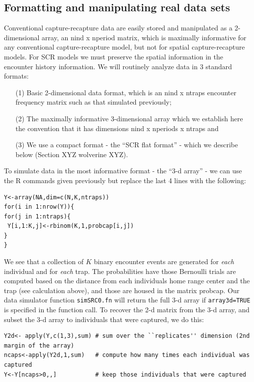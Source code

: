 \subsection{Formatting and manipulating real data sets}

Conventional capture-recapture data are easily stored and manipulated as a 2-dimensional array, an nind x nperiod matrix, which is maximally informative for any conventional capture-recapture model, but not for spatial capture-recapture models.  For SCR models we must preserve the spatial information in the encounter history information. We will routinely analyze data in 3 standard formats: 

\begin{itemize}
\item[(1)] Basic 2-dimensional data format, which is an nind x ntraps encounter frequency matrix such as that simulated previously; 
\item[(2)] The maximally informative 3-dimensional array which we establish here the convention that it has dimensions nind x nperiods x ntraps and 
\item[(3)] We use a compact format - the ``SCR flat format'' - which we describe below (Section XYZ wolverine XYZ).
\end{itemize}

To simulate data in the most informative format - the ``3-d array'' - we can use the R commands given previously but replace the last 4 lines with the following: 

\begin{verbatim}
Y<-array(NA,dim=c(N,K,ntraps))
for(i in 1:nrow(Y)){
for(j in 1:ntraps){
 Y[i,1:K,j]<-rbinom(K,1,probcap[i,j])
}
}
\end{verbatim}

We see that a collection of $K$ binary encounter events are generated for {\it each} individual and for {\it each} trap.  The probabilities have those Bernoulli trials are computed based on the distance from each individuals home range center and the trap (see calculation above), and those are housed in the matrix probcap. Our data simulator function \mbox{\tt simSRC0.fn} will return the full 3-d array if \mbox{\tt array3d=TRUE} is specified in the function call.
To recover the 2-d matrix from the 3-d array, and subset the 3-d array to individuals that were captured, we do this:

\begin{verbatim}
Y2d<- apply(Y,c(1,3),sum) # sum over the ``replicates'' dimension (2nd margin of the array)
ncaps<-apply(Y2d,1,sum)   # compute how many times each individual was captured
Y<-Y[ncaps>0,,]           # keep those individuals that were captured
\end{verbatim}



